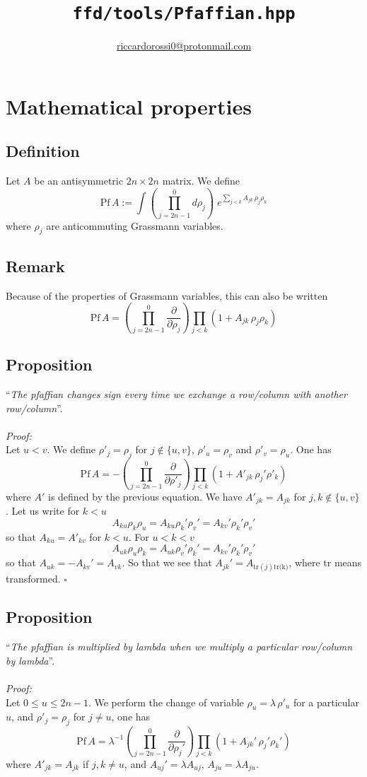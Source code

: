 \documentclass{article}
\title{\texttt{ffd/tools/Pfaffian.hpp}}
\author{\href{mailto:riccardorossi0@protonmail.com}{riccardorossi0@protonmail.com}}
\begin{document}
\maketitle
\section{Mathematical properties}
\subsection{Definition}
Let $A$ be an antisymmetric $2n\times 2n$ matrix. We define
$$
\text{Pf}\,A := \int \left(\prod_{j=2n-1}^{0} d\rho_{j}\right)\;e^{\sum_{j<k}A_{jk}\,\rho_j\rho_k}
$$
where $\rho_j$ are anticommuting Grassmann variables.
\subsection{Remark}
Because of the properties of Grassmann variables, this can also be written
$$
\text{Pf}\,A = \left(\prod_{j=2n-1}^{0}\frac{\partial }{\partial \rho_{j}}\right)\prod_{j<k}\left(1+A_{jk}\,\rho_j\rho_k\right)
$$
\subsection{Proposition}
``{\it The pfaffian changes sign every time we exchange a row/column with another row/column}''.\\ \\
           {\it Proof:}\\
Let $u<v$. We define $\rho'_j=\rho_j$ for $j\notin \{u,v\}$, $\rho'_u=\rho_v$ and $\rho'_v=\rho_u$. One has
$$
\text{Pf}\,A=-\left(\prod_{j=2n-1}^{0}\frac{\partial }{\partial \rho'_{j}}\right)\prod_{j<k}\left(1+A'_{jk}\,\rho_j'\rho'_k\right)
$$
where $A'$ is defined by the previous equation. We have $A'_{jk} = A_{jk}$ for $j,k\notin\{u,v\}$. Let us write for $k<u$
$$
A_{ku}\rho_k\rho_u=A_{ku}\rho_k'\rho_v'=A_{kv}'\rho_k'\rho_v'
$$
so that $A_{ku}=A'_{kv}$ for $k<u$. For $u<k<v$
$$
A_{uk}\rho_u\rho_k=A_{uk}\rho_v'\rho_k'=A_{kv}'\rho_k'\rho_v'
$$
so that $A_{uk}=-A_{kv}'=A_{vk}$. So that we see that $A_{jk}'=A_{\text{tr}(j)\text{tr(k)}}$, where $\text{tr}$ means transformed. $\square$
\subsection{Proposition}
``{\it The pfaffian is multiplied by lambda when we multiply a particular row/column by lambda}''. \\ \\
{\it Proof:}\\ 
Let $0\le u\le 2n-1$. We perform  the change of variable $\rho_u=\lambda\,\rho'_u$ for a particular $u$, and $\rho'_j=\rho_j$ for $j\neq u$, one has
$$
\text{Pf}\,A = \lambda^{-1} \left(\prod_{j=2n-1}^{0}\frac{\partial }{\partial \rho_{j}'}\right)\prod_{j<k}\left(1+A_{jk}'\,\rho_j'\rho_k'\right)
$$
where $A'_{jk}=A_{jk}$ if $j,k\neq u$, and $A_{uj}'=\lambda A_{uj}$, $A_{ju}=\lambda A_{ju}$.
\end{document}
